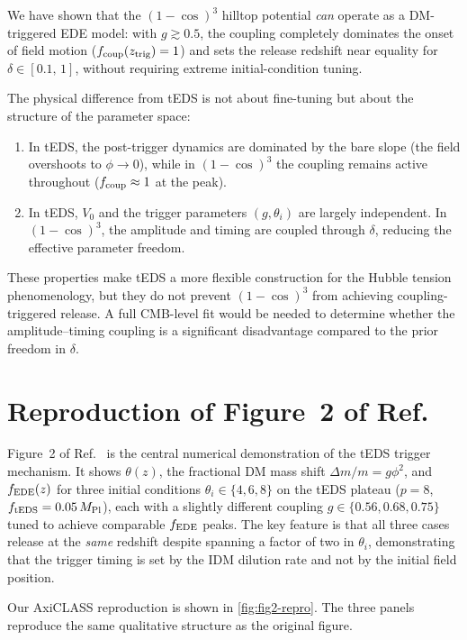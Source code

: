 \documentclass[aps,onecolumn,prd,nofootinbib,superscriptaddress,10pt,longbibliography,floatfix]{revtex4-2}
\newcommand{\mpl}{M_{\rm Pl}}
\newcommand{\fcoup}{f_{\rm coup}}
\begin{document}
We have shown that the $(1-\cos)^3$ hilltop potential \emph{can} operate as a DM-triggered EDE model: with $g\gtrsim 0.5$, the coupling completely dominates the onset of field motion ($\fcoup(z_{\rm trig})=1$) and sets the release redshift near equality for $\delta\in[0.1,\,1]$, without requiring extreme initial-condition tuning.

The physical difference from tEDS is not about fine-tuning but about the structure of the parameter space:
\begin{enumerate}
\item In tEDS, the post-trigger dynamics are dominated by the bare slope (the field overshoots to $\phi\to 0$), while in $(1-\cos)^3$ the coupling remains active throughout ($\fcoup\approx 1$ at the peak).
\item In tEDS, $V_0$ and the trigger parameters $(g,\theta_i)$ are largely independent. In $(1-\cos)^3$, the amplitude and timing are coupled through $\delta$, reducing the effective parameter freedom.
\end{enumerate}

These properties make tEDS a more flexible construction for the Hubble tension phenomenology, but they do not prevent $(1-\cos)^3$ from achieving coupling-triggered release. A full CMB-level fit would be needed to determine whether the amplitude--timing coupling is a significant disadvantage compared to the prior freedom in $\delta$.

\appendix
\section{Reproduction of Figure~2 of Ref.~\cite{Lin:2022teds}}
\label{app:fig2-repro}

Figure~2 of Ref.~\cite{Lin:2022teds} is the central numerical demonstration of the tEDS trigger mechanism. It shows $\theta(z)$, the fractional DM mass shift $\Delta m/m = g\phi^2$, and $f_{\rm EDE}(z)$ for three initial conditions $\theta_i\in\{4,6,8\}$ on the tEDS plateau ($p=8$, $f_{\rm tEDS}=0.05\,\mpl$), each with a slightly different coupling $g\in\{0.56,0.68,0.75\}$ tuned to achieve comparable $f_{\rm EDE}$ peaks. The key feature is that all three cases release at the \emph{same} redshift despite spanning a factor of two in $\theta_i$, demonstrating that the trigger timing is set by the IDM dilution rate and not by the initial field position.

Our AxiCLASS reproduction is shown in \cref{fig:fig2-repro}. The three panels reproduce the same qualitative structure as the original figure.
\end{document}
